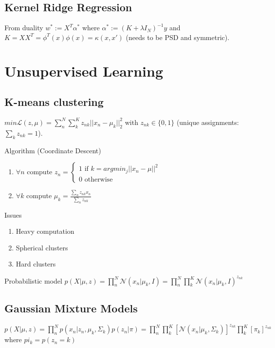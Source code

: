 \subsection{Kernel Ridge Regression}
From duality $w^* := X^T \alpha^*$ where $\alpha^* := (K + \lambda I_N)^{-1}y$ and $K=XX^T = \phi^T(x) \phi(x) = \kappa(x,x')$ (needs to be PSD and symmetric).


\section{Unsupervised Learning}
\subsection{K-means clustering}

$min \mathcal{L}(z,\mu) = \sum_n^N \sum_k^K z_{nk} ||x_n - \mu_k||^2_2$ with $z_{nk} \in \{0,1\}$ (unique assignments: $\sum_k z_{nk} = 1$).

Algorithm (Coordinate Descent)
\begin{enumerate}
\item $\forall n$ compute $z_n = \begin{cases}
	1 \text{ if } k = argmin_j || x_n - \mu||^2 \\
	0 \text{ otherwise }
   \end{cases}$
\item $\forall k$ compute $\mu_k = \frac{\sum_n z_{nk} x_n}{\sum_n z_{nk}}$
\end{enumerate}

Issues
\begin{enumerate}
	\item Heavy computation
	\item Spherical clusters
	\item Hard clusters
\end{enumerate}

Probabilistic model
$p(X|\mu,z) = \prod_n^N \mathcal{N}(x_n|\mu_k,I) = \prod_n^N \prod_k^K \mathcal{N}(x_n|\mu_k,I)^{z_{nk}}$

\subsection{Gaussian Mixture Models}
$p(X|\mu,z) = \prod_n^N p(x_n|z_n,\mu_k,\Sigma_k)p(z_n|\pi)
= \prod_n^N \prod_k^K [\mathcal{N}(x_n|\mu_k,\Sigma_k)]^{z_{nk}} \prod_k^K [\pi_k]^{z_{nk}}$ where $pi_k = p(z_n=k)$

